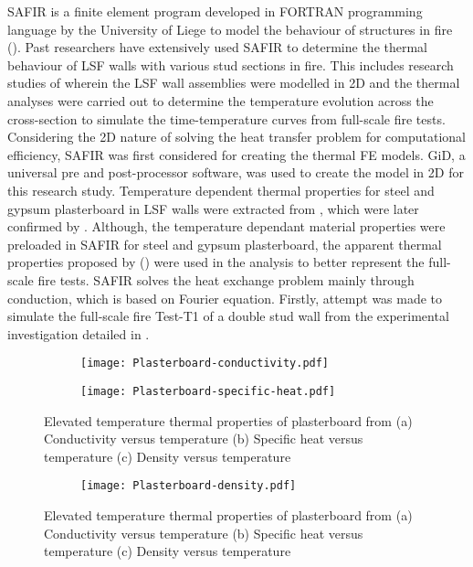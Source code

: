 SAFIR is a finite element program developed in FORTRAN programming language by the University of Liege to model the behaviour of structures in fire (\citet{safir2017}). Past researchers have extensively used SAFIR to determine the thermal behaviour of LSF walls with various stud sections in fire. This includes research studies of \citet{Keerthan2012a,Keerthan2013} wherein the LSF wall assemblies were modelled in 2D and the thermal analyses were carried out to determine the temperature evolution across the cross-section to simulate the time-temperature curves from full-scale fire tests. Considering the 2D nature of solving the heat transfer problem for computational efficiency, SAFIR was first considered for creating the thermal FE models. GiD, a universal pre and post-processor software, was used to create the model in 2D for this research study. Temperature dependent thermal properties for steel and gypsum plasterboard in LSF walls were extracted from \citet{Maneesha2018}, which were later confirmed by \citet{Steau2020}. Although, the temperature dependant material properties were preloaded in SAFIR for steel and gypsum plasterboard, the apparent thermal properties proposed by \citet{Maneesha2018} () were used in the analysis to better represent the full-scale fire tests. SAFIR solves the heat exchange problem mainly through conduction, which is based on Fourier equation. Firstly, attempt was made to simulate the full-scale fire Test-T1 of a double stud wall from the experimental investigation detailed in . 
\begin{figure}[!htbp]
	\centering
	\begin{subfigure}[b]{0.6\textwidth}
		\centering
		\texttt{[image: Plasterboard-conductivity.pdf]}
		\caption{}
		\label{subfig:Plasterboard-conductivity}
	\end{subfigure}
	\begin{subfigure}[b]{0.6\textwidth}
		\centering
		\texttt{[image: Plasterboard-specific-heat.pdf]}
		\caption{}
		\label{subfig:Plasterboard-specific-heat}
	\end{subfigure}
	   \caption{Elevated temperature thermal properties of plasterboard from \citet{Maneesha2018} (a) Conductivity versus temperature (b) Specific heat versus temperature (c) Density versus temperature}
	   \label{fig:plasterboard-thermal}
\end{figure}
\begin{figure}[!htbp]
	\ContinuedFloat
	\centering
	\begin{subfigure}[b]{0.6\textwidth}
		\centering
		\texttt{[image: Plasterboard-density.pdf]}
		\caption{}
		\label{subfig:Plasterboard-density}
	\end{subfigure}
	   \caption{Elevated temperature thermal properties of plasterboard from \citet{Maneesha2018} (a) Conductivity versus temperature (b) Specific heat versus temperature (c) Density versus temperature}
	   \label{fig:plasterboard-thermal}
\end{figure}
